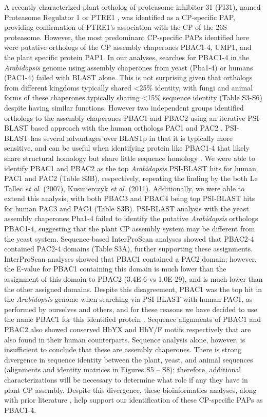 A recently characterized plant ortholog of proteasome inhibitor 31 (PI31), named Proteasome Regulator 1 or PTRE1 \citep{yang16}, was identified as a CP-specific PAP, providing confirmation of PTRE1’s association with the CP of the 26S proteasome. However, the most predominant CP-specific PAPs identified here were putative orthologs of the CP assembly chaperones PBAC1-4, UMP1, and the plant specific protein PAP1. In our analyses, searches for PBAC1-4 in the \textit{Arabidopsis} genome using assembly chaperones from yeast (Pba1-4) or humans (PAC1-4) failed with BLAST alone. This is not surprising given that orthologs from different kingdoms typically shared <25\% identity, with fungi and animal forms of these chaperones typically sharing <15\% sequence identity (Table S3-S6) despite having similar functions. However two independent groups identified orthologs to the assembly chaperones PBAC1 and PBAC2 using an iterative PSI-BLAST based approach with the human orthologs PAC1 and PAC2 \citep{kusmierczyk11, le07}. PSI-BLAST has several advantages over BLASTp in that it is typically more sensitive, and can be useful when identifying protein like PBAC1-4 that likely share structural homology but share little sequence homology \citep{altschul97, aravind99, kusmierczyk11, yashiroda08}. We were able to identify PBAC1 and PBAC2 as the top \textit{Arabidopsis} PSI-BLAST hits for human PAC1 and PAC2 (Table S3B), respectively, repeating the finding by the both Le Tallec \textit{et al}. (2007), Kusmierczyk \textit{et al}. (2011). Additionally, we were able to extend this analysis, with both PBAC3 and PBAC4 being top PSI-BLAST hits for human PAC3 and PAC4 (Table S3B). PSI-BLAST analysis with the yeast assembly chaperones Pba1-4 failed to identify the putative \textit{Arabidopsis} orthologs PBAC1-4, suggesting that the plant CP assembly system may be different from the yeast system. Sequence-based InterProScan analyses showed that PBAC2-4 contained PAC2-4 domains (Table S3A), further supporting these assignments. InterProScan analyses showed that PBAC1 contained a PAC2 domain; however, the E-value for PBAC1 containing this domain is much lower than the assignment of this domain to PBAC2 (3.4E-6 vs 1.0E-29), and is much lower than the other assigned domains. Despite this disagreement, PBAC1 was the top hit in the \textit{Arabidopsis} genome when searching via PSI-BLAST with human PAC1, as performed by ourselves and others, and for these reasons we have decided to use the name PBAC1 for this identified protein \citep{kusmierczyk11, le07}. Sequence alignments of PBAC1 and PBAC2 also showed conserved HbYX and HbY/F motifs respectively that are also found in their human counterparts. Sequence analysis alone, however, is insufficient to conclude that these are assembly chaperones. There is strong divergence in sequence identity between the plant, yeast, and animal sequences (alignments and identity matrices in Figures S5 – S8); therefore, additional characterizations will be necessary to determine what role if any they have in plant CP assembly. Despite this divergence, these bioinformatics analyses, along with prior literature \citep{kusmierczyk11, le07}, help support our identification of these CP-specific PAPs as PBAC1-4.

